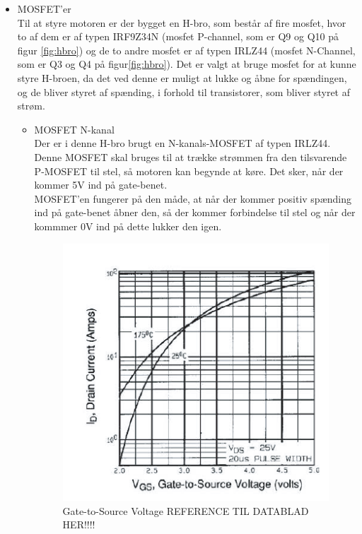 \begin{itemize}
\item MOSFET'er \\
Til at styre motoren er der bygget en H-bro, som består af fire mosfet, hvor to af dem er af typen IRF9Z34N (mosfet P-channel, som er Q9 og Q10 på figur \ref{fig:hbro}) og de to andre mosfet er af typen IRLZ44 (mosfet N-Channel, som er Q3 og Q4 på figur\ref{fig:hbro}). Det er valgt at bruge mosfet for at kunne styre H-broen, da det ved denne er muligt at lukke og åbne for spændingen, og de bliver styret af spænding, i forhold til transistorer, som bliver styret af strøm. 

\begin{itemize}
\item MOSFET N-kanal \\
	Der er i denne H-bro brugt en N-kanals-MOSFET af typen IRLZ44. Denne MOSFET skal bruges til at trække strømmen fra den tilsvarende P-MOSFET til stel, så motoren kan begynde at køre. Det sker, når der kommer 5V ind på gate-benet. 
	\\MOSFET'en fungerer på den måde, at når der kommer positiv spænding ind på gate-benet åbner den, så der kommer forbindelse til stel og når der kommmer 0V ind på dette lukker den igen. 
	
	\begin{figure}[H]
		\centering
		\includegraphics[width=\textwidth]{DesignOgImplementering/images/grafn}
		\caption{Gate-to-Source Voltage REFERENCE TIL DATABLAD HER!!!!}
		\label{fig:mosfetn}
	\end{figure}
	

\end{itemize}
\end{itemize}
